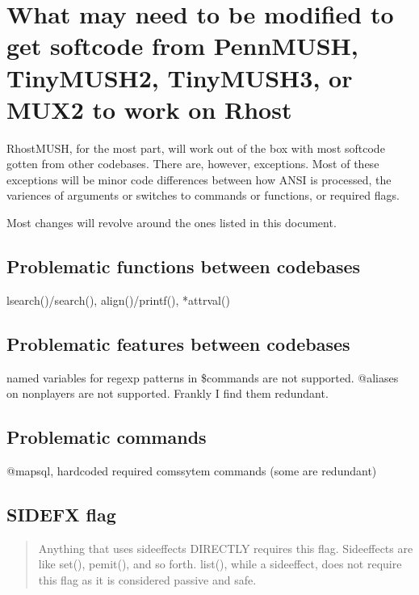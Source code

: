 \documentclass[letterpaper,10pt,english]{sphinxmanual}
\begin{document}
\section{What may need to be modified to get softcode from PennMUSH, TinyMUSH2, TinyMUSH3, or MUX2 to work on Rhost}
\label{\detokenize{differences:what-may-need-to-be-modified-to-get-softcode-from-pennmush-tinymush2-tinymush3-or-mux2-to-work-on-rhost}}
\sphinxAtStartPar
RhostMUSH, for the most part, will work out of the box with most softcode gotten
from other codebases.  There are, however, exceptions.  Most of these exceptions
will be minor code differences between how ANSI is processed, the variences
of arguments or switches to commands or functions, or required flags.

\sphinxAtStartPar
Most changes will revolve around the ones listed in this document.


\subsection{Problematic functions between codebases}
\label{\detokenize{differences:problematic-functions-between-codebases}}
\sphinxAtStartPar
lsearch()/search(), align()/printf(), *attrval()


\subsection{Problematic features between codebases}
\label{\detokenize{differences:problematic-features-between-codebases}}
\sphinxAtStartPar
named variables for regexp patterns in \$commands are not supported.
@aliases on non\sphinxhyphen{}players are not supported.  Frankly I find them redundant.


\subsection{Problematic commands}
\label{\detokenize{differences:problematic-commands}}
\sphinxAtStartPar
@mapsql, hardcoded required comssytem commands (some are redundant)


\subsection{SIDEFX flag}
\label{\detokenize{differences:sidefx-flag}}\begin{quote}

\sphinxAtStartPar
Anything that uses sideeffects \sphinxhyphen{}\sphinxhyphen{}DIRECTLY\sphinxhyphen{}\sphinxhyphen{} requires this flag.
Sideeffects are like set(), pemit(), and so forth.  list(), while a
side\sphinxhyphen{}effect, does not require this flag as it is considered passive and safe.
\end{quote}
\end{document}
